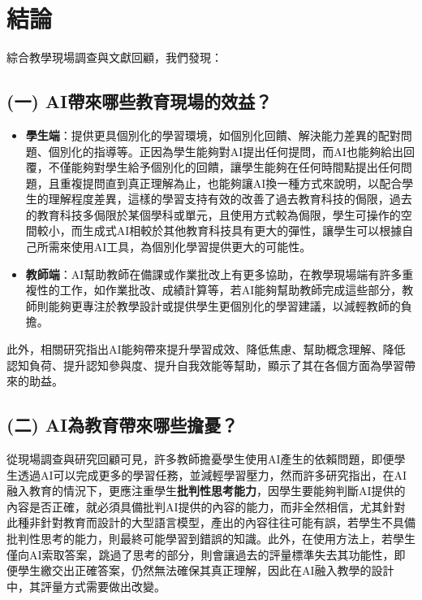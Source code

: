 
\section{結論}\label{sec:結論}

綜合教學現場調查與文獻回顧，我們發現：

\subsection{(一) AI帶來哪些教育現場的效益？}\label{sec:結論一}

\begin{itemize}
    \item \textbf{學生端}：提供更具個別化的學習環境，如個別化回饋、解決能力差異的配對問題、個別化的指導等。正因為學生能夠對AI提出任何提問，而AI也能夠給出回覆，不僅能夠對學生給予個別化的回饋，讓學生能夠在任何時間點提出任何問題，且重複提問直到真正理解為止，也能夠讓AI換一種方式來說明，以配合學生的理解程度差異，這樣的學習支持有效的改善了過去教育科技的侷限，過去的教育科技多侷限於某個學科或單元，且使用方式較為侷限，學生可操作的空間較小，而生成式AI相較於其他教育科技具有更大的彈性，讓學生可以根據自己所需來使用AI工具，為個別化學習提供更大的可能性。

    \item \textbf{教師端}：AI幫助教師在備課或作業批改上有更多協助，在教學現場端有許多重複性的工作，如作業批改、成績計算等，若AI能夠幫助教師完成這些部分，教師則能夠更專注於教學設計或提供學生更個別化的學習建議，以減輕教師的負擔。
\end{itemize}

此外，相關研究指出AI能夠帶來提升學習成效、降低焦慮、幫助概念理解、降低認知負荷、提升認知參與度、提升自我效能等幫助，顯示了其在各個方面為學習帶來的助益。

\subsection{(二) AI為教育帶來哪些擔憂？}\label{sec:結論二}

從現場調查與研究回顧可見，許多教師擔憂學生使用AI產生的依賴問題，即便學生透過AI可以完成更多的學習任務，並減輕學習壓力，然而許多研究指出，在AI融入教育的情況下，更應注重學生\textbf{批判性思考能力}，因學生要能夠判斷AI提供的內容是否正確，就必須具備批判AI提供的內容的能力，而非全然相信，尤其針對此種非針對教育而設計的大型語言模型，產出的內容往往可能有誤，若學生不具備批判性思考的能力，則最終可能學習到錯誤的知識。此外，在使用方法上，若學生僅向AI索取答案，跳過了思考的部分，則會讓過去的評量標準失去其功能性，即便學生繳交出正確答案，仍然無法確保其真正理解，因此在AI融入教學的設計中，其評量方式需要做出改變。

